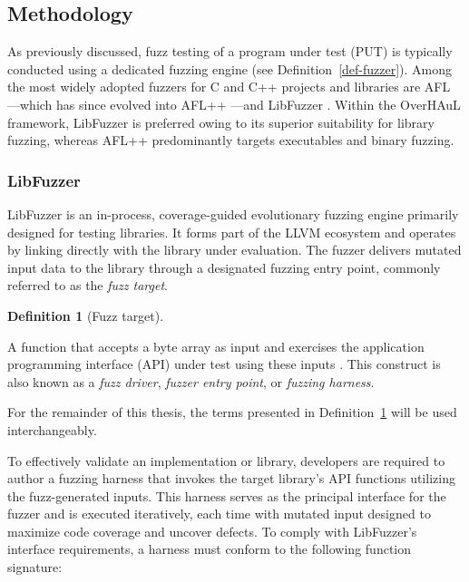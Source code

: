 \documentclass[
  a4paper,
  DIV=11,
  numbers=noendperiod]{scrreprt}
\theoremstyle{definition}
\newtheorem{definition}{Definition}[chapter]
\theoremstyle{remark}
\begin{document}
\subsection{Methodology}\label{methodology}

As previously discussed, fuzz testing of a program under test (PUT) is
typically conducted using a dedicated fuzzing engine (see
Definition~\ref{def-fuzzer}). Among the most widely adopted fuzzers for
C and C++ projects and libraries are AFL \autocite{afl}---which has
since evolved into AFL++ \autocite{aflpp}---and LibFuzzer
\autocite{libfuzzer}. Within the OverHAuL framework, LibFuzzer is
preferred owing to its superior suitability for library fuzzing, whereas
AFL++ predominantly targets executables and binary fuzzing.

\subsubsection{LibFuzzer}\label{libfuzzer}

LibFuzzer \autocite{libfuzzer} is an in-process, coverage-guided
evolutionary fuzzing engine primarily designed for testing libraries. It
forms part of the LLVM ecosystem \autocite{llvm} and operates by linking
directly with the library under evaluation. The fuzzer delivers mutated
input data to the library through a designated fuzzing entry point,
commonly referred to as the \emph{fuzz target}.

\begin{definition}[Fuzz
target]\protect\hypertarget{def-target}{}\label{def-target}

A function that accepts a byte array as input and exercises the
application programming interface (API) under test using these inputs
\autocite{libfuzzer}. This construct is also known as a \emph{fuzz
driver}, \emph{fuzzer entry point}, or \emph{fuzzing harness}.

\end{definition}

For the remainder of this thesis, the terms presented in
Definition~\ref{def-target} will be used interchangeably.

To effectively validate an implementation or library, developers are
required to author a fuzzing harness that invokes the target library's
API functions utilizing the fuzz-generated inputs. This harness serves
as the principal interface for the fuzzer and is executed iteratively,
each time with mutated input designed to maximize code coverage and
uncover defects. To comply with LibFuzzer's interface requirements, a
harness must conform to the following function signature:
\end{document}
